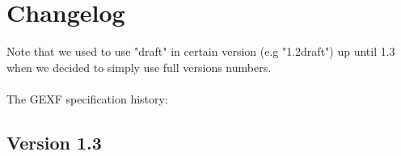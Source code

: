 \documentclass[a4paper,10pt]{article}
\begin{document}
\section{Changelog} \label{changelog}

Note that we used to use "draft" in certain version (e.g "1.2draft") up until 1.3 when we decided to simply use full versions numbers.

\paragraph{}
The GEXF specification history:

\subsection*{Version 1.3}
\end{document}

